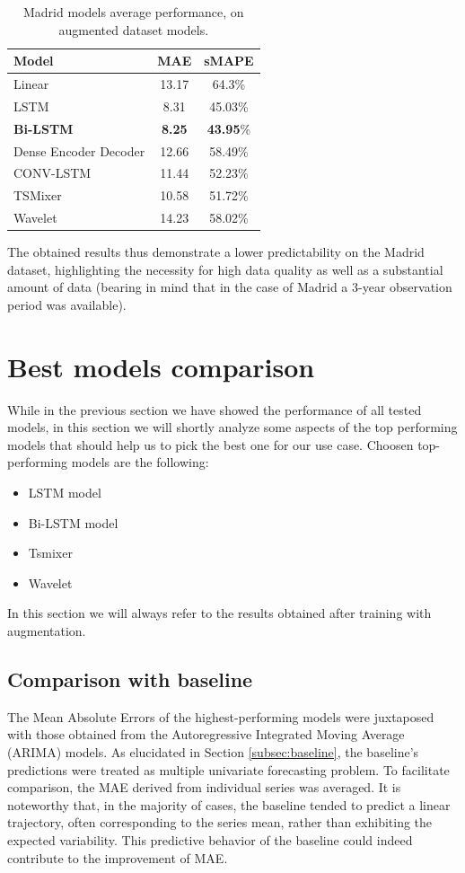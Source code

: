 \begin{table}[]
    \centering
    \begin{tabular}{lcc}
        \toprule
        \textbf{Model} & \textbf{MAE} & \textbf{sMAPE} \\ 
        \midrule
        Linear & 13.17 & 64.3\% \\
        LSTM & 8.31 & 45.03\% \\
       \textbf{Bi-LSTM}& \textbf{8.25} & \textbf{43.95}\% \\
        Dense Encoder Decoder & 12.66 & 58.49\% \\
        CONV-LSTM & 11.44 & 52.23\% \\
        TSMixer & 10.58 & 51.72\% \\
        Wavelet & 14.23 & 58.02\% \\ 
        \bottomrule
    \end{tabular}
    \caption{Madrid models average performance, on augmented dataset models.}
    \label{tab:Madrid_performance}
\end{table}

The obtained results thus demonstrate a lower predictability on the Madrid dataset, highlighting the necessity for high data quality as well as a substantial amount of data (bearing in mind that in the case of Madrid a 3-year observation period was available).

\section{Best models comparison}

While in the previous section we have showed the performance of all tested models, in this section we will shortly analyze some aspects of the top performing models that should help us to pick the best one for our use case. Choosen top-performing models are the following:
\begin{itemize}
    \item LSTM model
    \item Bi-LSTM model
    \item Tsmixer
    \item Wavelet
\end{itemize}

In this section we will always refer to the results obtained after training with augmentation.

\subsection{Comparison with baseline}
\label{subsec:baseline_comparison}
The Mean Absolute Errors of the highest-performing models were juxtaposed with those obtained from the Autoregressive Integrated Moving Average (ARIMA) models. As elucidated in Section \ref{subsec:baseline}, the baseline's predictions were treated as multiple univariate forecasting problem. To facilitate comparison, the MAE derived from individual series was averaged. It is noteworthy that, in the majority of cases, the baseline tended to predict a linear trajectory, often corresponding to the series mean, rather than exhibiting the expected variability. This predictive behavior of the baseline could indeed contribute to the improvement of MAE.

